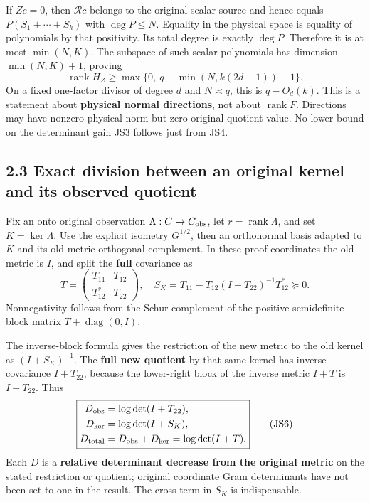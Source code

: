 \documentclass[
  11pt,
]{article}
\begin{document}
If \(Zc=0\), then \(\mathcal R c\) belongs to the original scalar source
and hence equals \(P(S_1+\cdots+S_k)\) with \(\deg P\le N\). Equality in
the physical space is equality of polynomials by that positivity. Its
total degree is exactly \(\deg P\). Therefore it is at most
\(\min(N,K)\). The subspace of such scalar polynomials has dimension
\(\min(N,K)+1\), proving \[
\boxed{\operatorname{rank}H_Z\ge
\max\{0,\ q-\min(N,k(2d-1))-1\}.} \tag{JS4}
\] On a fixed one-factor divisor of degree \(d\) and \(N\asymp q\), this
is \(q-O_d(k)\). This is a statement about \textbf{physical normal
directions}, not about \(\operatorname{rank}F\). Directions may have
nonzero physical norm but zero original quotient value. No lower bound
on the determinant gain JS3 follows just from JS4.

\subsection{2.3 Exact division between an original kernel and its
observed
quotient}\label{exact-division-between-an-original-kernel-and-its-observed-quotient}

Fix an onto original observation \(\Lambda:C\to C_{\rm obs}\), let
\(r=\operatorname{rank}\Lambda\), and set \(K=\ker\Lambda\). Use the
explicit isometry \(G^{1/2}\), then an orthonormal basis adapted to
\(K\) and its old-metric orthogonal complement. In these proof
coordinates the old metric is \(I\), and split the \textbf{full}
covariance as \[
T=\begin{pmatrix}T_{11}&T_{12}\\T_{12}^*&T_{22}\end{pmatrix},
\quad
S_K=T_{11}-T_{12}(I+T_{22})^{-1}T_{12}^*\succeq0.
\tag{JS5}
\] Nonnegativity follows from the Schur complement of the positive
semidefinite block matrix \(T+\operatorname{diag}(0,I)\).

The inverse-block formula gives the restriction of the new metric to the
old kernel as \((I+S_K)^{-1}\). The \textbf{full new quotient} by that
same kernel has inverse covariance \(I+T_{22}\), because the lower-right
block of the inverse metric \(I+T\) is \(I+T_{22}\). Thus \[
\boxed{
\begin{aligned}
D_{\rm obs}&=\log\det(I+T_{22}),\\
D_{\rm ker}&=\log\det(I+S_K),\\
D_{\rm total}&=D_{\rm obs}+D_{\rm ker}=\log\det(I+T).
\end{aligned}} \tag{JS6}
\] Each \(D\) is a \textbf{relative determinant decrease from the
original metric} on the stated restriction or quotient; original
coordinate Gram determinants have not been set to one in the result. The
cross term in \(S_K\) is indispensable.
\end{document}
